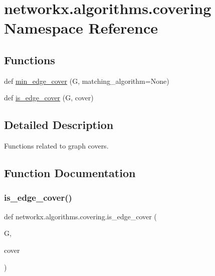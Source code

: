 \hypertarget{namespacenetworkx_1_1algorithms_1_1covering}{}\section{networkx.\+algorithms.\+covering Namespace Reference}
\label{namespacenetworkx_1_1algorithms_1_1covering}
\subsection*{Functions}
\begin{DoxyCompactItemize}
\item 
def \hyperlink{namespacenetworkx_1_1algorithms_1_1covering_ab3764d89e742d671d83a959d57dd76b4}{min\+\_\+edge\+\_\+cover} (G, matching\+\_\+algorithm=None)
\item 
def \hyperlink{namespacenetworkx_1_1algorithms_1_1covering_a0ba4208f7c9c10d561d138319c0bd75e}{is\+\_\+edge\+\_\+cover} (G, cover)
\end{DoxyCompactItemize}


\subsection{Detailed Description}
\begin{DoxyVerb}Functions related to graph covers.\end{DoxyVerb}
 

\subsection{Function Documentation}
\mbox{\label{namespacenetworkx_1_1algorithms_1_1covering_a0ba4208f7c9c10d561d138319c0bd75e}} 
\subsubsection{\texorpdfstring{is\+\_\+edge\+\_\+cover()}{is\_edge\_cover()}}
{\footnotesize\ttfamily def networkx.\+algorithms.\+covering.\+is\+\_\+edge\+\_\+cover (\begin{DoxyParamCaption}\item[{}]{G,  }\item[{}]{cover }\end{DoxyParamCaption})}

